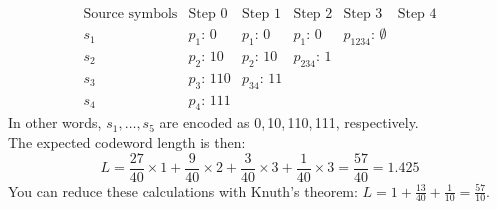\documentclass[11pt]{article}
\begin{document}
\begin{itemize}
     \[\begin{array}{clllll}
 \text{Source symbols}& \text{Step 0}  & \text{Step 1} & \text{Step 2} & \text{Step 3} & \text{Step 4}\\[1mm]
         s_1          & p_1:\,       0 & p_1:\,     0  & p_1:\,       0& p_{1234}:\,\emptyset\\[1mm]
         s_2          & p_2:\,      10 & p_2:\,    10  & p_{234}:\,   1\\[1mm]
         s_3          & p_3:\,     110 & p_{34}:\, 11\\[1mm]
         s_4          & p_4:\,     111
     \end{array}\]
     In other words, $s_1,\ldots,s_5$ are encoded as 0,\,10,\,110,\,111, respectively.\\
     The expected codeword length is then:
     \[
       L = \frac{27}{40}\times 1 + \frac{9}{40}\times 2 + \frac{3}{40}\times 3 + \frac{1}{40}\times 3
         = \frac{57}{40}
         = 1.425
     \]
     You can reduce these calculations with Knuth's theorem: $L = 1 + \frac{13}{40} + \frac{1}{10} = \frac{57}{10}$.
\end{itemize}
\end{document}
